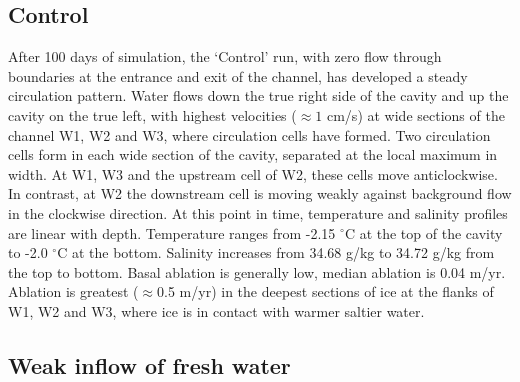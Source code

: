 


\subsection{Control} \label{sec:control_run}

After 100 days of simulation, the `Control' run, with zero flow through boundaries at the entrance and exit of the channel, has developed a steady circulation pattern.
Water flows down the true right side of the cavity and up the cavity on the true left, with highest velocities ($\approx 1$ cm/s) at wide sections of the channel W1, W2 and W3, where circulation cells have formed. Two circulation cells form in each wide section of the cavity, separated at the local maximum in width. At W1, W3 and the upstream cell of W2, these cells move anticlockwise. In contrast, at W2 the downstream cell is moving weakly against background flow in the clockwise direction.   At this point in time, temperature and salinity profiles are linear with depth. Temperature ranges from -2.15 $^{\circ}$C at the top of the cavity to -2.0 $^{\circ}$C at the bottom. Salinity increases from 34.68 g/kg to 34.72 g/kg from the top to bottom. 
Basal ablation is generally low, median ablation is 0.04 m/yr. Ablation is greatest ($\approx$0.5 m/yr) in the deepest sections of ice at the flanks of W1, W2 and W3, where ice is in contact with warmer saltier water.

\subsection{Weak inflow of fresh water} \label{sec:weak_BC_results}

